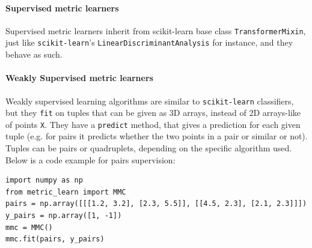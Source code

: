 \documentclass[twoside,11pt]{article}
\begin{document}
\paragraph{Supervised metric learners}


Supervised metric learners inherit from scikit-learn base class \texttt{TransformerMixin}, just like \texttt{scikit-learn}'s \texttt{LinearDiscriminantAnalysis} for instance, and they behave as such.


\paragraph{Weakly Supervised metric learners} 
Weakly supervised learning algorithms are similar to \texttt{scikit-learn} classifiers, but they \texttt{fit} on tuples that can be given as 3D arrays, instead of 2D arrays-like of points \texttt{X}. They have a \texttt{predict} method, that gives a prediction for each given tuple (e.g. for pairs it predicts whether the two points in a pair or similar or not). Tuples can be pairs or quadruplets, depending on the specific algorithm used. Below is a code example for pairs supervision:

\begin{verbatim}
import numpy as np
from metric_learn import MMC
pairs = np.array([[[1.2, 3.2], [2.3, 5.5]], [[4.5, 2.3], [2.1, 2.3]]])
y_pairs = np.array([1, -1])
mmc = MMC()
mmc.fit(pairs, y_pairs)
\end{verbatim}
\end{document}
